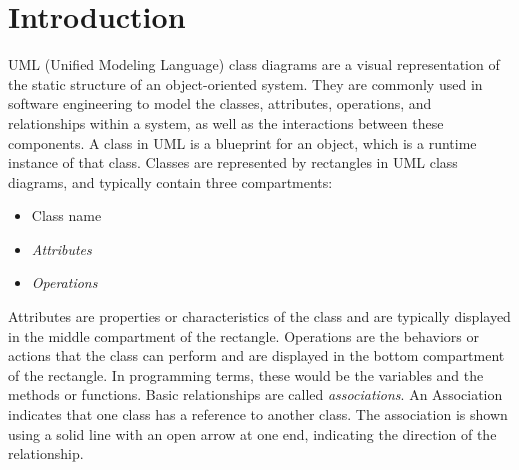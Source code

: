 \documentclass[
	12pt,
    a4paper,
    egregdoesnotlikesansseriftitles, %
    toc=chapterentrywithdots,
    oneside, openany,
    titlepage,
    parskip=half,
    headings=normal,  %
    listof=totoc,
    bibliography=totoc,
    index=totoc,
    captions=tableheading,  %
    listof=flat,
    numbers=noenddot, %
    final]
    {scrbook}
\begin{document}
\setcounter{secnumdepth}{3}  %
\setcounter{tocdepth}{2}  %


\frontmatter


\tableofcontents

\listoffigures
\clearpage %

\listoftables
\clearpage %

\renewcommand{\lstlistlistingname}{List of Listings}  %
\lstlistoflistings
\clearpage %

\mainmatter

\chapter{Introduction}
UML (Unified Modeling Language) class diagrams are a visual representation of the static structure of an object-oriented system. 
They are commonly used in software engineering to model the classes, attributes, operations, and relationships within a system, as well as the interactions between these components. 
A class in UML is a blueprint for an object, which is a runtime instance of that class. 
Classes are represented by rectangles in UML class diagrams, and typically contain three compartments: 
\begin{itemize}
	\item Class name
	\item \emph{Attributes}
	\item \emph{Operations}
\end{itemize}
Attributes are properties or characteristics of the class and are typically displayed in the middle compartment of the rectangle.
Operations are the behaviors or actions that the class can perform and are displayed in the bottom compartment of the rectangle.
In programming terms, these would be the variables and the methods or functions.
Basic relationships are called \emph{associations}. 
An Association indicates that one class has a reference to another class. \cite[p. 108-111]{uml}
The association is shown using a solid line with an open arrow at one end, indicating the direction of the relationship. \cite[p. 142-143]{uml}
\end{document}
